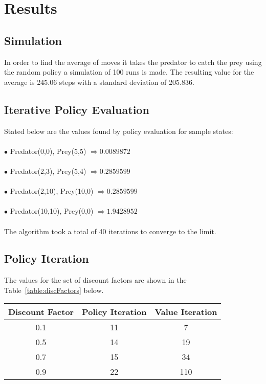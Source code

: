 \documentclass[11pt]{article}
\begin{document}
\section{Results\\}


\subsection{Simulation}
In order to find the average of moves it takes the predator to catch the prey using the random policy a simulation of 100 runs is made. The resulting value for the average is 245.06 steps with a standard deviation of 205.836.\\



\subsection{Iterative Policy Evaluation}


Stated below are the values found by policy evaluation for sample states:\\\\
$\bullet$ Predator(0,0), Prey(5,5) $\Rightarrow 0.0089872$\\\\
$\bullet$ Predator(2,3), Prey(5,4) $\Rightarrow  0.2859599$\\\\
$\bullet$ Predator(2,10), Prey(10,0) $\Rightarrow  0.2859599$\\\\
$\bullet$ Predator(10,10), Prey(0,0) $\Rightarrow  1.9428952$\\\\
The algorithm took a total of 40 iterations to converge to the limit.\\

\pagebreak
\subsection{Policy Iteration}

The values for the set of discount factors are shown in the Table~\ref{table:discFactors} below.
\begin{center}
\begin{table*}[ht]
{\small
\hfill{}
\begin{tabular}{c|c|c}
\textbf{Discount Factor} & \textbf{Policy Iteration} & \textbf{Value Iteration}\\
	\hline
0.1 & 11 & 7\\
0.5 & 14 & 19\\
0.7 & 15 & 34\\
0.9 & 22 & 110\\
\end{tabular}}
\hfill{}
\caption{Number of iterations for different discount factors.}
\label{table:discFactors}
\end{table*}
\end{center}
\end{document}
